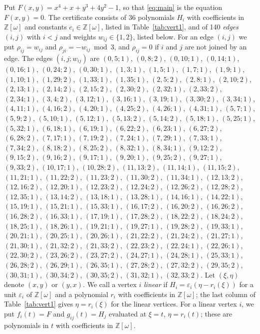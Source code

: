 \documentclass[11pt]{article}
\newcommand{\Z}{\mathbb{Z}}
\begin{document}
Put $F(x,y)=x^{4}+x+y^{3}+4y^{2}-1$, so that \eqref{eq:main} is the equation $F(x,y)=0$. The certificate consists of 36 polynomials $H_i$ with coefficients in $\Z[\omega]$ and constants $c_i\in\Z[\omega]$, listed in Table~\ref{tab:vert1}, and of 140 \emph{edges} $(i,j)$ with $i<j$ and weights $w_{ij}\in\{1,2\}$, listed below. For an edge $(i,j)$ we put $\rho_{ij}=w_{ij}$ and $\rho_{ji}=-w_{ij}\bmod 3$, and $\rho_{ij}=0$ if $i$ and $j$ are not joined by an edge.
The edges $(i,j;w_{ij})$ are $(0,5;1)$, $(0,8;2)$, $(0,10;1)$, $(0,14;1)$, $(0,16;1)$, $(0,24;2)$, $(0,30;1)$, $(1,3;1)$, $(1,5;1)$, $(1,7;1)$, $(1,9;1)$, $(1,10;1)$, $(1,29;2)$, $(1,33;1)$, $(1,35;1)$, $(2,5;2)$, $(2,8;1)$, $(2,10;2)$, $(2,13;1)$, $(2,14;2)$, $(2,15;2)$, $(2,30;2)$, $(2,32;1)$, $(2,33;2)$, $(2,34;1)$, $(3,4;2)$, $(3,12;1)$, $(3,16;1)$, $(3,19;1)$, $(3,30;2)$, $(3,34;1)$, $(4,11;1)$, $(4,16;2)$, $(4,20;1)$, $(4,25;2)$, $(4,26;1)$, $(4,31;1)$, $(5,7;1)$, $(5,9;2)$, $(5,10;1)$, $(5,12;1)$, $(5,13;2)$, $(5,14;2)$, $(5,18;1)$, $(5,25;1)$, $(5,32;1)$, $(6,18;1)$, $(6,19;1)$, $(6,22;2)$, $(6,23;1)$, $(6,27;2)$, $(6,28;2)$, $(7,17;1)$, $(7,19;2)$, $(7,24;1)$, $(7,29;1)$, $(7,33;1)$, $(7,34;2)$, $(8,18;2)$, $(8,25;2)$, $(8,32;1)$, $(8,34;1)$, $(9,12;2)$, $(9,15;2)$, $(9,16;2)$, $(9,17;1)$, $(9,20;1)$, $(9,25;2)$, $(9,27;1)$, $(9,33;2)$, $(10,17;1)$, $(10,28;2)$, $(11,13;2)$, $(11,14;1)$, $(11,15;2)$, $(11,21;1)$, $(11,22;2)$, $(11,23;2)$, $(11,30;2)$, $(11,34;1)$, $(12,13;2)$, $(12,16;2)$, $(12,20;1)$, $(12,23;2)$, $(12,24;2)$, $(12,26;2)$, $(12,28;2)$, $(12,35;1)$, $(13,14;2)$, $(13,18;1)$, $(13,28;1)$, $(14,16;1)$, $(14,22;1)$, $(15,19;1)$, $(15,21;1)$, $(15,33;1)$, $(16,17;2)$, $(16,20;2)$, $(16,26;2)$, $(16,28;2)$, $(16,33;1)$, $(17,19;1)$, $(17,28;2)$, $(18,22;2)$, $(18,24;2)$, $(18,25;1)$, $(18,26;1)$, $(19,21;1)$, $(19,27;1)$, $(19,28;2)$, $(19,33;1)$, $(20,21;1)$, $(20,25;1)$, $(20,26;1)$, $(21,22;2)$, $(21,24;2)$, $(21,27;1)$, $(21,30;1)$, $(21,32;2)$, $(21,33;2)$, $(22,23;2)$, $(22,24;1)$, $(22,26;1)$, $(22,30;2)$, $(23,26;2)$, $(23,27;2)$, $(24,27;1)$, $(24,28;1)$, $(25,33;1)$, $(26,28;2)$, $(26,29;1)$, $(26,35;1)$, $(27,28;2)$, $(27,32;2)$, $(29,35;2)$, $(30,31;1)$, $(30,34;2)$, $(30,35;2)$, $(31,32;1)$, $(32,33;2)$.
Let $(\xi,\eta)$ denote $(x,y)$ or $(y,x)$. We call a vertex $i$ \emph{linear} if $H_i=\varepsilon_i(\eta-r_i(\xi))$ for a unit $\varepsilon_i$ of $\Z[\omega]$ and a polynomial $r_i$ with coefficients in $\Z[\omega]$; the last column of Table~\ref{tab:vert1} gives $\eta=r_i(\xi)$ for the linear vertices. For a linear vertex $i$, we put $f_i(t)=F$ and $g_{ij}(t)=H_j$ evaluated at $\xi=t$, $\eta=r_i(t)$; these are polynomials in $t$ with coefficients in $\Z[\omega]$.
\end{document}
